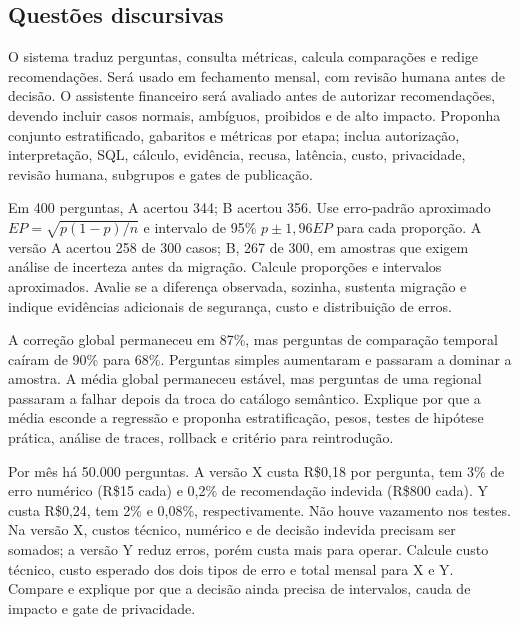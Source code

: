 \subsection{Questões discursivas}

\TextoBase
O sistema traduz perguntas, consulta métricas, calcula comparações e redige recomendações. Será usado em fechamento mensal, com revisão humana antes de decisão.
O assistente financeiro será avaliado antes de autorizar recomendações, devendo incluir casos normais, ambíguos, proibidos e de alto impacto.
\FonteDidatica
\Comando Proponha conjunto estratificado, gabaritos e métricas por etapa; inclua autorização, interpretação, SQL, cálculo, evidência, recusa, latência, custo, privacidade, revisão humana, subgrupos e gates de publicação.

\TextoBase
Em 400 perguntas, A acertou 344; B acertou 356. Use erro-padrão aproximado $EP=\sqrt{p(1-p)/n}$ e intervalo de 95\% $p\pm1{,}96EP$ para cada proporção.
A versão A acertou 258 de 300 casos; B, 267 de 300, em amostras que exigem análise de incerteza antes da migração.
\FonteDidatica
\Comando Calcule proporções e intervalos aproximados. Avalie se a diferença observada, sozinha, sustenta migração e indique evidências adicionais de segurança, custo e distribuição de erros.

\TextoBase
A correção global permaneceu em 87\%, mas perguntas de comparação temporal caíram de 90\% para 68\%. Perguntas simples aumentaram e passaram a dominar a amostra.
A média global permaneceu estável, mas perguntas de uma regional passaram a falhar depois da troca do catálogo semântico.
\FonteDidatica
\Comando Explique por que a média esconde a regressão e proponha estratificação, pesos, testes de hipótese prática, análise de traces, rollback e critério para reintrodução.

\TextoBase
Por mês há 50.000 perguntas. A versão X custa R\$0,18 por pergunta, tem 3\% de erro numérico (R\$15 cada) e 0,2\% de recomendação indevida (R\$800 cada). Y custa R\$0,24, tem 2\% e 0,08\%, respectivamente. Não houve vazamento nos testes.
Na versão X, custos técnico, numérico e de decisão indevida precisam ser somados; a versão Y reduz erros, porém custa mais para operar.
\FonteDidatica
\Comando Calcule custo técnico, custo esperado dos dois tipos de erro e total mensal para X e Y. Compare e explique por que a decisão ainda precisa de intervalos, cauda de impacto e gate de privacidade.

